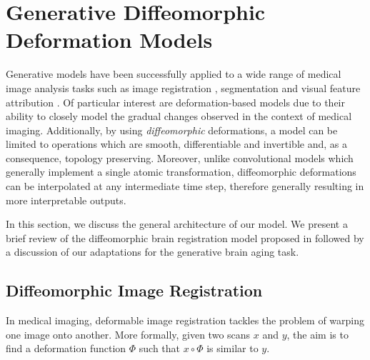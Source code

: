\chapter{Generative Diffeomorphic Deformation Models}
Generative models have been successfully applied to a wide range of medical image analysis tasks such as image registration \cite{balakrishnan2019voxelmorph}, segmentation \cite{dong2017automatic} and visual feature attribution \cite{baumgartner2018visual}. Of particular interest are deformation-based models due to their ability to closely model the gradual changes observed in the context of medical imaging.
Additionally, by using \textit{diffeomorphic} deformations, a model can be limited to operations which are smooth, differentiable and invertible and, as a consequence, topology preserving.
Moreover, unlike convolutional models which generally implement a single atomic transformation, diffeomorphic deformations can be interpolated at any intermediate time step, therefore generally resulting in more interpretable outputs.



In this section, we discuss the general architecture of our model. We present a brief review of the diffeomorphic brain registration model proposed in \cite{balakrishnan2019voxelmorph} \cite{dalca2018unsupervised} followed by a discussion of our adaptations for the generative brain aging task.

\section{Diffeomorphic Image Registration}
\label{chap:voxelmorph}
In medical imaging, deformable image registration tackles the problem of warping one image onto another. More formally, given two scans $x$ and $y$, the aim is to find a deformation function $\Phi$ such that $x \circ \Phi$ is similar to $y$.

